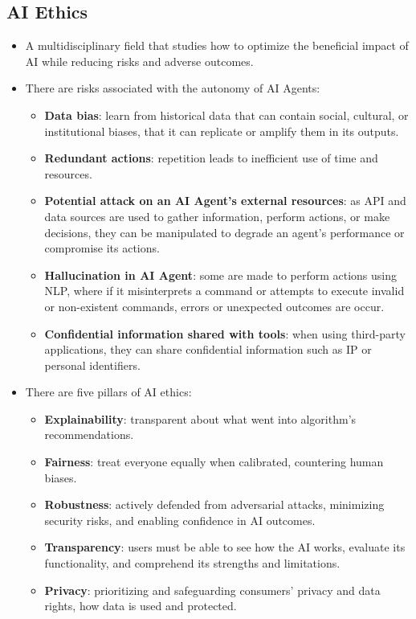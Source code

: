 \documentclass[12pt, letterpaper]{article}
\begin{document}
\subsection{AI Ethics}
\begin{itemize}
    \item A multidisciplinary field that studies how to optimize the beneficial impact of AI while reducing risks and adverse outcomes.
    \item There are risks associated with the autonomy of AI Agents:
        \begin{itemize}
            \item \textbf{Data bias}: learn from historical data that can contain social, cultural, or institutional biases, that it can replicate or amplify them in its outputs.
            \item \textbf{Redundant actions}: repetition leads to inefficient use of time and resources.
            \item \textbf{Potential attack on an AI Agent's external resources}: as API and data sources are used to gather information, perform actions, or make decisions, they can be manipulated to degrade an agent's performance or compromise its actions.
            \item \textbf{Hallucination in AI Agent}: some are made to perform actions using NLP, where if it misinterprets a command or attempts to execute invalid or non-existent commands, errors or unexpected outcomes are occur.
            \item \textbf{Confidential information shared with tools}: when using third-party applications, they can share confidential information such as IP or personal identifiers.
        \end{itemize}
    \item There are five pillars of AI ethics:
        \begin{itemize}
            \item \textbf{Explainability}: transparent about what went into algorithm's recommendations.
            \item \textbf{Fairness}: treat everyone equally when calibrated, countering human biases.
            \item \textbf{Robustness}: actively defended from adversarial attacks, minimizing security risks, and enabling confidence in AI outcomes.
            \item \textbf{Transparency}: users must be able to see how the AI works, evaluate its functionality, and comprehend its strengths and limitations. 
            \item \textbf{Privacy}: prioritizing and safeguarding consumers' privacy and data rights, how data is used and protected.
        \end{itemize}
\end{itemize}
\end{document}
